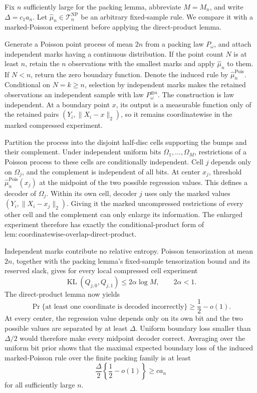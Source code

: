 Fix \(n\) sufficiently large for the packing lemma, abbreviate \(M=M_n\), and write \(\Delta=c_1a_n\).  Let \(\widehat\mu_n\in\mathcal T_n^{\mathrm{NP}}\) be an arbitrary fixed-sample rule.  We compare it with a marked-Poisson experiment before applying the direct-product lemma.

Generate a Poisson point process of mean \(2n\) from a packing law \(P_\omega\), and attach independent marks having a continuous distribution.  If the point count \(N\) is at least \(n\), retain the \(n\) observations with the smallest marks and apply \(\widehat\mu_n\) to them.  If \(N<n\), return the zero boundary function.  Denote the induced rule by \(\widehat\mu_n^{\mathrm{Pois}}\).  Conditional on \(N=k\geq n\), selection by independent marks makes the retained observations an independent sample with law \(P_\omega^{\otimes n}\).  The construction is law independent.  At a boundary point \(x\), its output is a measurable function only of the retained pairs \((Y_i,\lVert X_i-x\rVert_2)\), so it remains coordinatewise in the marked compressed experiment.

Partition the process into the disjoint half-disc cells supporting the bumps and their complement.  Under independent uniform bits \(\Omega_1,\ldots,\Omega_M\), restrictions of a Poisson process to these cells are conditionally independent.  Cell \(j\) depends only on \(\Omega_j\), and the complement is independent of all bits.  At center \(x_j\), threshold \(\widehat\mu_n^{\mathrm{Pois}}(x_j)\) at the midpoint of the two possible regression values.  This defines a decoder of \(\Omega_j\).  Within its own cell, decoder \(j\) uses only the marked values \((Y_i,\lVert X_i-x_j\rVert_2)\).  Giving it the marked uncompressed restrictions of every other cell and the complement can only enlarge its information.  The enlarged experiment therefore has exactly the conditional-product form of \(\mathrm{lem:coordinatewise\text{-}overlap\text{-}direct\text{-}product}\).

Independent marks contribute no relative entropy.  Poisson tensorization at mean \(2n\), together with the packing lemma's fixed-sample tensorization bound and its reserved slack, gives for every local compressed cell experiment
\[
 \operatorname{KL}(Q_{j,0},Q_{j,1})
 \leq2\alpha\log M,
 \qquad 2\alpha<1.
\]
The direct-product lemma now yields
\[
 \Pr\{\text{at least one coordinate is decoded incorrectly}\}
 \geq\frac12-o(1).
\]
At every center, the regression value depends only on its own bit and the two possible values are separated by at least \(\Delta\).  Uniform boundary loss smaller than \(\Delta/2\) would therefore make every midpoint decoder correct.  Averaging over the uniform bit prior shows that the maximal expected boundary loss of the induced marked-Poisson rule over the finite packing family is at least
\[
 \frac\Delta2\left\{\frac12-o(1)\right\}
 \geq c a_n
\]
for all sufficiently large \(n\).

